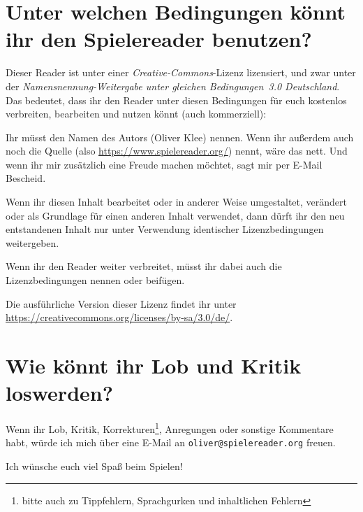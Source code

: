 \section{Unter welchen Bedingungen könnt ihr den Spielereader benutzen?}
Dieser Reader ist unter einer \emph{Creative-Commons}-Lizenz lizensiert, und zwar unter der \emph{Namensnennung-Weitergabe unter gleichen Bedingungen~3.0 Deutschland}. Das bedeutet, dass ihr den Reader unter diesen Bedingungen für euch kostenlos verbreiten, bearbeiten und nutzen könnt (auch kommerziell):
\begin{description}
  \item[Namensnennung.] Ihr müsst den Namen des Autors (Oliver Klee) nennen. Wenn ihr außerdem auch noch die Quelle (also \url{https://www.spielereader.org/}) nennt, wäre das nett. Und wenn ihr mir zusätzlich eine Freude machen möchtet, sagt mir per E-Mail Bescheid.
  \item[Weitergabe unter gleichen Bedingungen.] Wenn ihr diesen Inhalt bearbeitet oder in anderer Weise umgestaltet, verändert oder als Grundlage für einen anderen Inhalt verwendet, dann dürft ihr den neu entstandenen Inhalt nur unter Verwendung identischer Lizenzbedingungen weitergeben.
  \item Wenn ihr den Reader weiter verbreitet, müsst ihr dabei auch die Lizenzbedingungen nennen oder beifügen.
\end{description}

Die ausführliche Version dieser Lizenz findet ihr unter \url{https://creativecommons.org/licenses/by-sa/3.0/de/}.

\section{Wie könnt ihr Lob und Kritik loswerden?}
Wenn ihr Lob, Kritik, Korrekturen\footnote{bitte auch zu Tippfehlern, Sprachgurken und inhaltlichen Fehlern}, Anregungen oder sonstige Kommentare habt, würde ich mich über eine E-Mail an \texttt{oliver@spielereader.org} freuen.

Ich wünsche euch viel Spaß beim Spielen!
